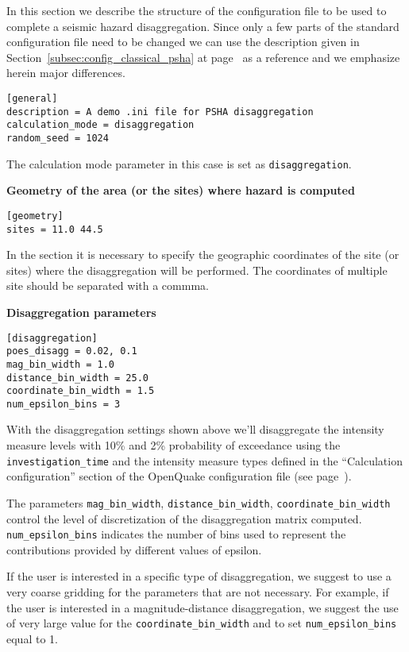 In this section we describe the structure of the configuration file to be used
to complete a seismic hazard disaggregation. Since only a few parts of the
standard configuration file need to be changed we can use the description
given in Section~\ref{subsec:config_classical_psha} at
page~\pageref{subsec:config_classical_psha} as a reference and we emphasize
herein major differences.


\begin{verbatim}
[general]
description = A demo .ini file for PSHA disaggregation
calculation_mode = disaggregation
random_seed = 1024
\end{verbatim}

The calculation mode parameter in this case is set as
\texttt{disaggregation}.



\textbf{Geometry of the area (or the sites) where hazard is computed}

\begin{verbatim}
[geometry]
sites = 11.0 44.5
\end{verbatim}

In the section it is necessary to specify the geographic coordinates of
the site (or sites) where the disaggregation will be performed. The coordinates
of multiple site should be separated with a commma.



\textbf{Disaggregation parameters}

\begin{verbatim}
[disaggregation]
poes_disagg = 0.02, 0.1
mag_bin_width = 1.0
distance_bin_width = 25.0
coordinate_bin_width = 1.5
num_epsilon_bins = 3
\end{verbatim}

With the disaggregation settings shown above we'll disaggregate the intensity
measure levels with 10\% and 2\% probability of exceedance using the
\texttt{in\-ves\-ti\-gation\_time} and the intensity measure types  defined in
the ``Calculation configuration'' section of the OpenQuake configuration file
(see page~\pageref{sec:calculation_configuration}).

The parameters \texttt{mag\_bin\_width},  \texttt{distance\_bin\_width},
\texttt{coordinate\_bin\_width} control the level of discretization of the
disaggregation matrix computed. \texttt{num\_epsilon\_bins} indicates the
number of bins used to represent the contributions provided by different
values of epsilon.

If the user is interested in a specific type of disaggregation, we suggest to
use a very coarse gridding for the parameters that are  not necessary. For
example, if the user is interested in a magnitude-distance  disaggregation, we
suggest the use of very large value for the
\texttt{coordinate\_\-bin\_\-width} and to set  \texttt{num\_epsilon\_bins}
equal to 1.
